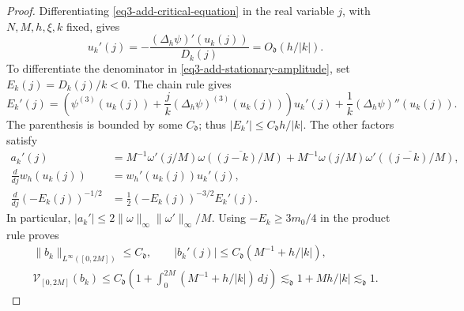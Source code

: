 \documentclass[reqno,12pt]{amsart}
\numberwithin{equation}{section}
\begin{document}
\begin{proof}
Differentiating \eqref{eq3-add-critical-equation} in the real variable
$j$, with $N,M,h,\xi,k$ fixed, gives
\begin{equation}
 u_k'(j)=-\frac{(\Delta_h\psi)'(u_k(j))}{D_k(j)}
                =O_{\mathfrak d}(h/|k|).
 \label{eq3-add-critical-point-derivative}
\end{equation}
To differentiate the denominator in
\eqref{eq3-add-stationary-amplitude}, set $E_k(j)=D_k(j)/k<0$.
The chain rule gives
\[
 E_k'(j)=\left(\psi^{(3)}(u_k(j))
       +\frac jk(\Delta_h\psi)^{(3)}(u_k(j))\right)u_k'(j)
       +\frac1k(\Delta_h\psi)''(u_k(j)).
\]
The parenthesis is bounded by some $C_{\mathfrak d}$; thus
$|E_k'|\le C_{\mathfrak d}h/|k|$. The other factors satisfy
\begin{align*}
 a_k'(j)&=M^{-1}\omega'(j/M)\overline{\omega((j-k)/M)}
   +M^{-1}\omega(j/M)\overline{\omega'((j-k)/M)},\\
 \frac d{dj}w_h(u_k(j))&=w_h'(u_k(j))u_k'(j),\\
 \frac d{dj}(-E_k(j))^{-1/2}
   &=\frac12(-E_k(j))^{-3/2}E_k'(j).
\end{align*}
In particular, $|a_k'|\le2\|\omega\|_\infty\|\omega'\|_\infty/M$.
Using $-E_k\ge3m_0/4$ in the product rule proves
\begin{equation}
 \begin{gathered}
 \|b_k\|_{L^\infty([0,2M])}\le C_{\mathfrak d},\qquad
 |b_k'(j)|\le C_{\mathfrak d}(M^{-1}+h/|k|),\\
 \mathcal V_{[0,2M]}(b_k)
 \le C_{\mathfrak d}\left(1+\int_0^{2M}(M^{-1}+h/|k|)\,dj\right)
 \lesssim_{\mathfrak d}1+Mh/|k|\lesssim_{\mathfrak d}1.
 \end{gathered}
 \label{eq3-add-amplitude-variation}
\end{equation}


\end{proof}
\end{document}

